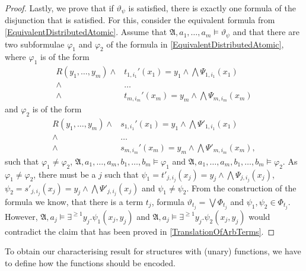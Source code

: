 \documentclass[a4paper,11pt,DIV=15]{scrartcl} %
\renewcommand{\phi}{\varphi}
\theoremstyle{plain}
\theoremstyle{definition}
\renewcommand{\theta}{\vartheta}
\begin{document}
\begin{proof}
	Lastly, we prove that if $\theta_\psi$ is satisfied, there is exactly one formula of the disjunction that is satisfied.
	For this, consider the equivalent formula from \cref{EquivalentDistributedAtomic}.
	Assume that $\mathfrak A,a_1,\dots,a_m\models \theta_\psi$ and that there are two subformulae $\phi_1$ and $\phi_2$ of the formula in \cref{EquivalentDistributedAtomic}, where $\phi_1$ is of the form 
	\begin{align*}
		R(y_1,\dots,y_m)\land & t_{1,i_1}'(x_1)=y_1 \land \bigwedge\Psi_{1,i_1}(x_1) \\
		\land & \dots \\
		\land & t_{m,i_m}'(x_m)=y_m \land \bigwedge\Psi_{m,i_m}(x_m)
	\end{align*}
	and $\phi_2$ is of the form
	\begin{align*}
		R(y_1,\dots,y_m)\land & s_{1,i_1}'(x_1)=y_1 \land \bigwedge\Psi'_{1,i_1}(x_1) \\
		\land & \dots \\
		\land & s_{m,i_m}'(x_m)=y_m \land \bigwedge\Psi'_{m,i_m}(x_m),
	\end{align*}
	such that $\phi_1\neq\phi_2$, $\mathfrak A,a_1,\dots,a_m,b_1,\dots,b_m\models \phi_1$ and $\mathfrak A,a_1,\dots,a_m,b_1,\dots,b_m\models \phi_2$.
	As $\phi_1\neq \phi_2$, there must be a $j$ such that $\psi_1=t'_{j,i_j}(x_j)=y_j\land \bigwedge \Psi_{j,i_j}(x_j)$, $\psi_2 = s'_{j,i_j}(x_j)=y_j\land\bigwedge \Psi'_{j,i_j}(x_j)$ and $\psi_1\neq\psi_2$.
	From the construction of the formula we know, that there is a term $t_j$, formula $\theta_{t_j}=\bigvee \Phi_{t_j}$ and $\psi_1,\psi_2\in\Phi_{t_j}$.
	However, $\mathfrak A,a_j\models \exists^{\geq 1}y_j . \psi_1(x_j,y_j)$ and $\mathfrak A,a_j\models \exists^{\geq 1}y_j.\psi_2(x_j,y_j)$ would contradict the claim that has been proved in \cref{TranslationOfArbTerms}.
\end{proof}

To obtain our characterising result for structures with (unary) functions, we have to define how the functions should be encoded.
\end{document}
